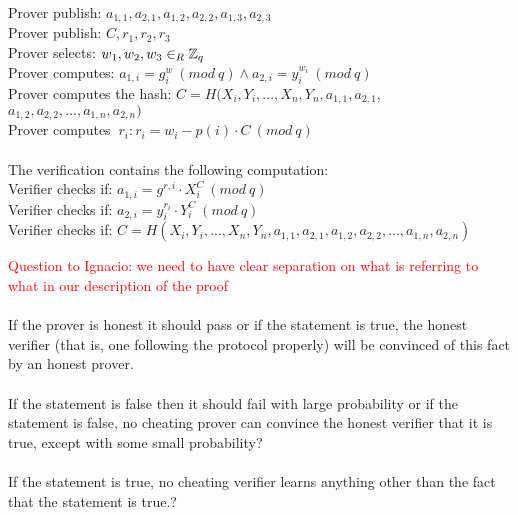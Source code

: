 \begin{infobox}
Prover publish:  $a_{1,1},a_{2,1},a_{1,2},a_{2,2},a_{1,3},a_{2,3}$ \\
Prover publish:                   $C,r_1,r_2,r_3$ \\
Prover selects:  $w_1, w_2,w_3\in_R \mathbb{Z}_q$ \\
Prover computes: $a_{1,i}=g^w_i \ (mod\ q) \land a_{2,i}=y_i^{w_i} \ (mod\ q)$ \\
Prover computes the hash:  $C=H(X_i,Y_i,...,X_n,Y_n,a_{1,1},a_{2,1},$\\
$a_{1,2},a_{2,2},...,a_{1,n},a_{2,n})$\\
Prover computes  $\ r_i:  r_i=w_i-p(i)  \cdot  C \ (mod\ q)$ \\\\
The verification contains the following computation: \\
Verifier checks if: $a_{1,i} = g^{r,i} \cdot X_i^C \ (mod\ q) $        \\
Verifier checks if: $a_{2,i} =y_i^{r_{i}}  \cdot  Y_i^C \ (mod\ q)  $   \\
Verifier checks if: $C=H(X_i,Y_i,...,X_n,Y_n,a_{1,1},a_{2,1},a_{1,2},a_{2,2},...,a_{1,n},a_{2,n})$

\end{infobox}



\begin{infobox}
\textcolor{red}{Question to Ignacio: we need to have clear separation on what is referring to what in our description of the proof}\\\\
 If the prover is honest it should pass or if the statement is true, the honest verifier (that is, one following the protocol properly)
will be convinced of this fact by an honest prover.\\\\
If the statement is false then it should fail with large probability or if the statement is false, no cheating prover can convince
the honest verifier that it is true, except with some small probability?\\\\
 If the statement is true, no cheating verifier learns anything other than the fact that the statement is true.?
\end{infobox}

